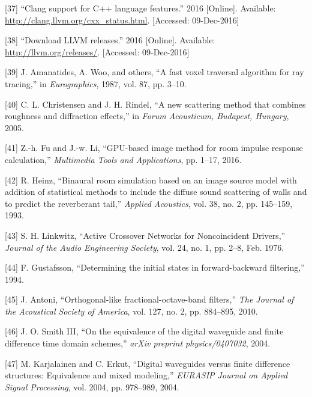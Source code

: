 \documentclass[]{scrreprt}
\begin{document}
\hypertarget{ref-ux5fclangux5f2016}{}
{[}37{]} ``Clang support for C++ language features.'' 2016 {[}Online{]}.
Available: \url{http://clang.llvm.org/cxx_status.html}. {[}Accessed:
09-Dec-2016{]}

\hypertarget{ref-ux5fdownloadux5f2016}{}
{[}38{]} ``Download LLVM releases.'' 2016 {[}Online{]}. Available:
\url{http://llvm.org/releases/}. {[}Accessed: 09-Dec-2016{]}

\hypertarget{ref-amanatidesux5ffastux5f1987}{}
{[}39{]} J. Amanatides, A. Woo, and others, ``A fast voxel traversal
algorithm for ray tracing,'' in \emph{Eurographics}, 1987, vol. 87, pp.
3--10.

\hypertarget{ref-christensenux5fnewux5f2005}{}
{[}40{]} C. L. Christensen and J. H. Rindel, ``A new scattering method
that combines roughness and diffraction effects,'' in \emph{Forum
Acousticum, Budapest, Hungary}, 2005.

\hypertarget{ref-fuux5fgpu-basedux5f2016}{}
{[}41{]} Z.-h. Fu and J.-w. Li, ``GPU-based image method for room
impulse response calculation,'' \emph{Multimedia Tools and
Applications}, pp. 1--17, 2016.

\hypertarget{ref-heinzux5fbinauralux5f1993}{}
{[}42{]} R. Heinz, ``Binaural room simulation based on an image source
model with addition of statistical methods to include the diffuse sound
scattering of walls and to predict the reverberant tail,'' \emph{Applied
Acoustics}, vol. 38, no. 2, pp. 145--159, 1993.

\hypertarget{ref-linkwitzux5factiveux5f1976}{}
{[}43{]} S. H. Linkwitz, ``Active Crossover Networks for Noncoincident
Drivers,'' \emph{Journal of the Audio Engineering Society}, vol. 24, no.
1, pp. 2--8, Feb. 1976.

\hypertarget{ref-gustafssonux5fdeterminingux5f1994}{}
{[}44{]} F. Gustafsson, ``Determining the initial states in
forward-backward filtering,'' 1994.

\hypertarget{ref-antoniux5forthogonal-likeux5f2010}{}
{[}45{]} J. Antoni, ``Orthogonal-like fractional-octave-band filters,''
\emph{The Journal of the Acoustical Society of America}, vol. 127, no.
2, pp. 884--895, 2010.

\hypertarget{ref-smithux5fiiiux5fequivalenceux5f2004}{}
{[}46{]} J. O. Smith III, ``On the equivalence of the digital waveguide
and finite difference time domain schemes,'' \emph{arXiv preprint
physics/0407032}, 2004.

\hypertarget{ref-karjalainenux5fdigitalux5f2004}{}
{[}47{]} M. Karjalainen and C. Erkut, ``Digital waveguides versus finite
difference structures: Equivalence and mixed modeling,'' \emph{EURASIP
Journal on Applied Signal Processing}, vol. 2004, pp. 978--989, 2004.
\end{document}
